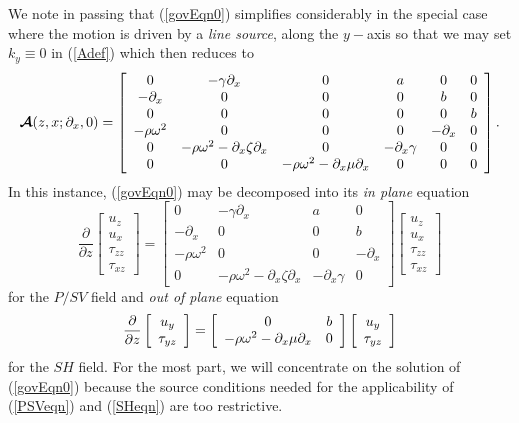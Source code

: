 \documentclass[11pt]{article}
\newcommand{\CB}[1]{\mbox{\boldmath$\cal #1$\unboldmath}}
\begin{document}
We note in passing that (\ref{govEqn0}) simplifies considerably in the
special case where the motion is driven by a {\em line source\/}, along
the $y-$axis so that we may set  $k_y\equiv 0$ in (\ref{Adef}) which then
reduces to
\[
{\CB A}(z,x;{\partial }_{x},0)
=\left[{\begin{array}{cccccc}
0&- \gamma {\partial }_{  x}&  0&  a&0&0\\ -{ \partial
}_{x}&0&0&0&b&0\\ 0&0&0&0&0&b\\ - \rho {\omega }^{
2}&  0&0&0&-{ \partial }_{x}&0\\ 0&- \rho {\omega
}^{  2}  -{ \partial }_{x} \zeta {\partial }_{
x} &
0&  -{ \partial }_{x} \gamma &  0&0\\
0&0 &  - \rho {\omega }^{  2}
 -{ \partial }_{x} \mu
{\partial }_{  x}& 0 &  0&0\end{array}}\right].
\]
In this instance,  (\ref{govEqn0}) may be decomposed into its {\em in plane\/}
equation
\begin{equation} 	\label{PSVeqn}
{\frac{ \partial }{\partial z}}\left[{\begin{array}{c}{u}_{z}\\
{u}_{x}\\
{\tau }_{zz}\\
{\tau }_{xz}\end{array}}\right]
=\left[{\begin{array}{cccc}
0&- \gamma {\partial }_{  x}&  a&0\\
-{ \partial }_{x}&0&0&b\\
- \rho {\omega }^{  2}&  0&0&-{ \partial }_{x}\\
0&- \rho {\omega }^{  2}  -{ \partial }_{x} \zeta {\partial }_{  x} &
 -{ \partial }_{x} \gamma &  0
\end{array}}\right]
\left[{\begin{array}{c}{u}_{z}\\
{u}_{x}\\
{\tau }_{zz}\\
{\tau }_{xz}\end{array}}\right]
\end{equation}
for the $P/SV$ field and {\em out of plane\/} equation
\begin{equation} 	\label{SHeqn}
	{\frac{\partial }{\partial z}}\left[{\begin{array}{c}{u}_{y}\\
	{\rm \tau }_{yz}\end{array}}\right]
	=\left[{\begin{array}{cc}
	0&b\\
	- \rho {\omega }^{  2}-{ \partial }_{x} \mu {\partial }_{  x}& 0
	\end{array}}\right]
	\left[{\begin{array}{c}{u}_{y}\\
	{\rm \tau }_{yz}\end{array}}\right]
\end{equation}
for the $SH$ field.
For the most part, we will concentrate on the solution of (\ref{govEqn0})
because the source conditions needed for the applicability of (\ref{PSVeqn}) and (\ref{SHeqn})
are too restrictive.
\end{document}
